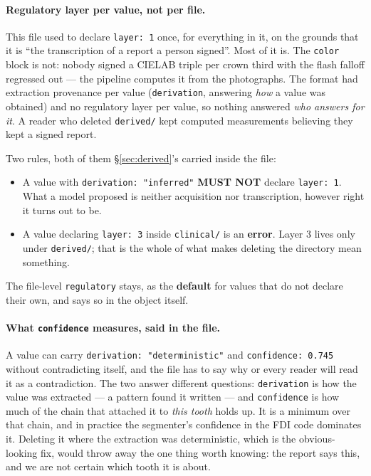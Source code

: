\documentclass[11pt,a4paper]{article}
\newcommand{\MUSTNOT}{\textcolor{uosred}{\textbf{MUST NOT}}}
\newcommand{\code}[1]{\texttt{\small #1}}
\begin{document}
\paragraph{Regulatory layer per value, not per file.}
This file used to declare \code{layer: 1} once, for everything in it, on the grounds that
it is ``the transcription of a report a person signed''. Most of it is. The \code{color}
block is not: nobody signed a CIELAB triple per crown third with the flash falloff
regressed out --- the pipeline computes it from the photographs. The format had extraction
provenance per value (\code{derivation}, answering \emph{how} a value was obtained) and no
regulatory layer per value, so nothing answered \emph{who answers for it}. A reader who
deleted \code{derived/} kept computed measurements believing they kept a signed report.

Two rules, both of them \S\ref{sec:derived}'s carried inside the file:

\begin{itemize}
  \item A value with \code{derivation: "inferred"} \MUSTNOT{} declare \code{layer: 1}.
  What a model proposed is neither acquisition nor transcription, however right it turns
  out to be.
  \item A value declaring \code{layer: 3} inside \code{clinical/} is an \textbf{error}.
  Layer 3 lives only under \code{derived/}; that is the whole of what makes deleting the
  directory mean something.
\end{itemize}

The file-level \code{regulatory} stays, as the \textbf{default} for values that do not
declare their own, and says so in the object itself.

\paragraph{What \code{confidence} measures, said in the file.}
A value can carry \code{derivation: "deterministic"} and \code{confidence: 0.745} without
contradicting itself, and the file has to say why or every reader will read it as a
contradiction. The two answer different questions: \code{derivation} is how the value was
extracted --- a pattern found it written --- and \code{confidence} is how much of the
chain that attached it to \emph{this tooth} holds up. It is a minimum over that chain, and
in practice the segmenter's confidence in the FDI code dominates it. Deleting it where the
extraction was deterministic, which is the obvious-looking fix, would throw away the one
thing worth knowing: the report says this, and we are not certain which tooth it is about.
\end{document}
